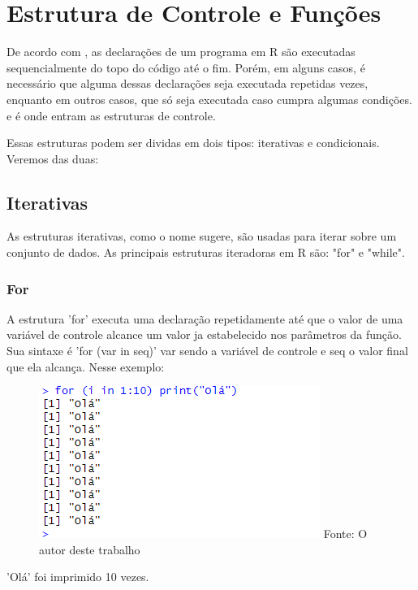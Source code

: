     \section{Estrutura de Controle e Fun\c{c}\~{o}es}
  	De acordo com \cite{Kabacoff2015}, as declarações de um programa em R são executadas sequencialmente do topo do código até o fim. Porém, em alguns casos, é necessário que alguma dessas declarações seja executada repetidas vezes, enquanto em outros casos, que só seja executada caso cumpra algumas condições. e é onde entram as estruturas de controle.\par 
  	Essas estruturas podem ser dividas em dois tipos: iterativas e condicionais. Veremos das duas:
  	\subsection{Iterativas}
  		As estruturas iterativas, como o nome sugere, são usadas para iterar sobre um conjunto de dados. As principais estruturas iteradoras em R são: "for" e "while".
  		\subsubsection{For}
  			A estrutura 'for' executa uma declaração repetidamente até que o valor de uma variável de controle alcance um valor ja estabelecido nos parâmetros da função. Sua sintaxe é 'for (var in seq)' var sendo a variável de controle e seq o valor final que ela alcança. Nesse exemplo:\begin{figure}[H]
  				\centering
  				\caption{}
  				\includegraphics[width=0.7\linewidth]{Prints/screenshot009}
  				\label{fig:screenshot009}
  				{\tiny \sf Fonte: O autor deste trabalho }
  			\end{figure}
  			'Olá' foi imprimido 10 vezes.
